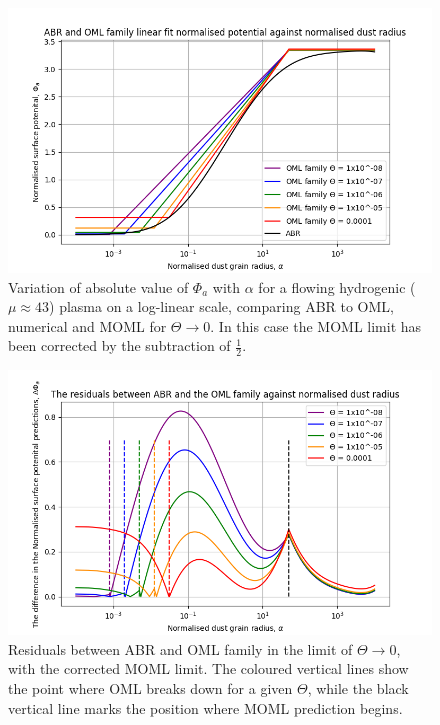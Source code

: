 \documentclass[journal]{Imperial_lab_report}
\begin{document}
\begin{figure}[H]
\centering
\includegraphics[width=\linewidth]{Output/CorrectedOMLvsABR.jpeg}
\caption{Variation of absolute value of $\Phi_a$ with $\alpha$ for a flowing hydrogenic ($\mu \approx 43$) plasma on a log-linear scale, comparing ABR to OML, numerical and MOML for $\Theta \xrightarrow{} 0$. In this case the MOML limit has been corrected by the subtraction of $\frac{1}{2}$.}
\label{CorrectedOMLvsABR} 
\end{figure}

\begin{figure}[H]
\centering
\includegraphics[width=\linewidth]{Output/CorrectedResiduals.jpeg}
\caption{Residuals between ABR and OML family in the limit of  $\Theta \xrightarrow{} 0$, with the corrected MOML limit. The coloured vertical lines show the point where OML breaks down for a given $\Theta$, while the black vertical line marks the position where MOML prediction begins.}
\label{CorrectedResiduals} 
\end{figure}
\end{document}

